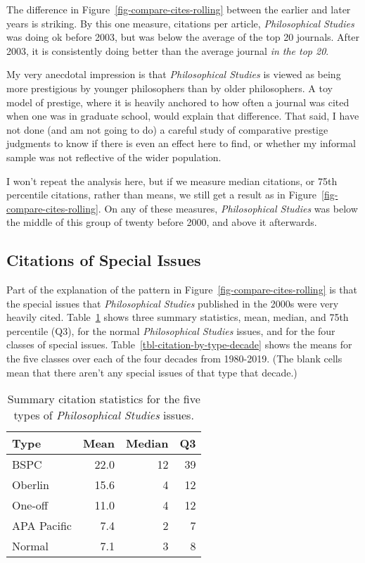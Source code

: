 \documentclass[
  10pt,
  letterpaper,
  DIV=11,
  numbers=noendperiod,
  twoside]{scrartcl}
\begin{document}
The difference in Figure~\ref{fig-compare-cites-rolling} between the
earlier and later years is striking. By this one measure, citations per
article, \emph{Philosophical Studies} was doing ok before 2003, but was
below the average of the top 20 journals. After 2003, it is consistently
doing better than the average journal \emph{in the top 20}.

My very anecdotal impression is that \emph{Philosophical Studies} is
viewed as being more prestigious by younger philosophers than by older
philosophers. A toy model of prestige, where it is heavily anchored to
how often a journal was cited when one was in graduate school, would
explain that difference. That said, I have not done (and am not going to
do) a careful study of comparative prestige judgments to know if there
is even an effect here to find, or whether my informal sample was not
reflective of the wider population.

I won't repeat the analysis here, but if we measure median citations, or
75th percentile citations, rather than means, we still get a result as
in Figure~\ref{fig-compare-cites-rolling}. On any of these measures,
\emph{Philosophical Studies} was below the middle of this group of
twenty before 2000, and above it afterwards.

\subsection{Citations of Special
Issues}\label{sec-citations-of-special-issues}

Part of the explanation of the pattern in
Figure~\ref{fig-compare-cites-rolling} is that the special issues that
\emph{Philosophical Studies} published in the 2000s were very heavily
cited. Table~\ref{tbl-citation-by-type} shows three summary statistics,
mean, median, and 75th percentile (Q3), for the normal
\emph{Philosophical Studies} issues, and for the four classes of special
issues. Table~\ref{tbl-citation-by-type-decade} shows the means for the
five classes over each of the four decades from 1980-2019. (The blank
cells mean that there aren't any special issues of that type that
decade.)

\begin{longtable}[]{@{}lrrr@{}}

\caption{\label{tbl-citation-by-type}Summary citation statistics for the
five types of \emph{Philosophical Studies} issues.}

\tabularnewline

\toprule\noalign{}
Type & Mean & Median & Q3 \\
\midrule\noalign{}
\endhead
\bottomrule\noalign{}
\endlastfoot
BSPC & 22.0 & 12 & 39 \\
Oberlin & 15.6 & 4 & 12 \\
One-off & 11.0 & 4 & 12 \\
APA Pacific & 7.4 & 2 & 7 \\
Normal & 7.1 & 3 & 8 \\

\end{longtable}
\end{document}

